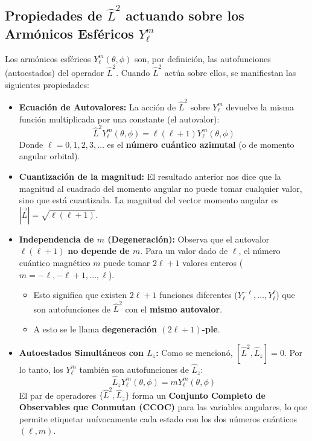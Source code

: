 \documentclass[a4paper]{article}
\begin{document}
\subsection{Propiedades de $\hat{L}^2$ actuando sobre los Armónicos Esféricos $Y_\ell^m$}

Los armónicos esféricos $Y_\ell^m(\theta, \phi)$ son, por definición, las autofunciones (autoestados) del operador $\hat{L}^2$. Cuando $\hat{L}^2$ actúa sobre ellos, se manifiestan las siguientes propiedades:

\begin{itemize}
    \item \textbf{Ecuación de Autovalores:} La acción de $\hat{L}^2$ sobre $Y_\ell^m$ devuelve la misma función multiplicada por una constante (el autovalor):
    $$\hat{L}^2 Y_\ell^m(\theta, \phi) = \ell(\ell + 1) Y_\ell^m(\theta, \phi)$$
    Donde $\ell = 0, 1, 2, 3, \dots$ es el \textbf{número cuántico azimutal} (o de momento angular orbital).
    
    \item \textbf{Cuantización de la magnitud:} El resultado anterior nos dice que la magnitud al cuadrado del momento angular no puede tomar cualquier valor, sino que está cuantizada. La magnitud del vector momento angular es $|\vec{L}| = \sqrt{\ell(\ell+1)}$.
    
    \item \textbf{Independencia de $m$ (Degeneración):} Observa que el autovalor $\ell(\ell+1)$ \textbf{no depende de $m$}. Para un valor dado de $\ell$, el número cuántico magnético $m$ puede tomar $2\ell + 1$ valores enteros ($m = -\ell, -\ell+1, \dots, \ell$).
    \begin{itemize}
        \item Esto significa que existen $2\ell + 1$ funciones diferentes ($Y_\ell^{-\ell}, \dots, Y_\ell^{\ell}$) que son autofunciones de $\hat{L}^2$ con el \textbf{mismo autovalor}.
        \item A esto se le llama \textbf{degeneración $(2\ell + 1)$-ple}.
    \end{itemize}
    
    \item \textbf{Autoestados Simultáneos con $\hat{L}_z$:} Como se mencionó, $[\hat{L}^2, \hat{L}_z] = 0$. Por lo tanto, los $Y_\ell^m$ también son autofunciones de $\hat{L}_z$:
    $$\hat{L}_z Y_\ell^m(\theta, \phi) = m Y_\ell^m(\theta, \phi)$$
    El par de operadores $\{\hat{L}^2, \hat{L}_z\}$ forma un \textbf{Conjunto Completo de Observables que Conmutan (CCOC)} para las variables angulares, lo que permite etiquetar unívocamente cada estado con los dos números cuánticos $(\ell, m)$.
    

\end{itemize}
\end{document}
